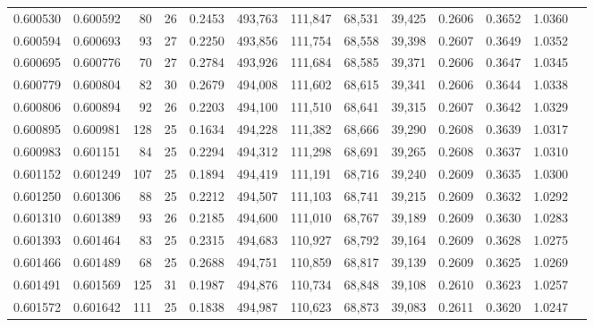 \begin{tabular}{rrrrrrrrrrrrr}
0.600530 & 0.600592 &  80 &  26 &                                     0.2453 & 493,763 & 111,847 &  68,531 &  39,425 & 0.2606 & 0.3652 & 1.0360 \\
0.600594 & 0.600693 &  93 &  27 &                                     0.2250 & 493,856 & 111,754 &  68,558 &  39,398 & 0.2607 & 0.3649 & 1.0352 \\
0.600695 & 0.600776 &  70 &  27 &                                     0.2784 & 493,926 & 111,684 &  68,585 &  39,371 & 0.2606 & 0.3647 & 1.0345 \\
0.600779 & 0.600804 &  82 &  30 &                                     0.2679 & 494,008 & 111,602 &  68,615 &  39,341 & 0.2606 & 0.3644 & 1.0338 \\
0.600806 & 0.600894 &  92 &  26 &                                     0.2203 & 494,100 & 111,510 &  68,641 &  39,315 & 0.2607 & 0.3642 & 1.0329 \\
0.600895 & 0.600981 & 128 &  25 &                                     0.1634 & 494,228 & 111,382 &  68,666 &  39,290 & 0.2608 & 0.3639 & 1.0317 \\
0.600983 & 0.601151 &  84 &  25 &                                     0.2294 & 494,312 & 111,298 &  68,691 &  39,265 & 0.2608 & 0.3637 & 1.0310 \\
0.601152 & 0.601249 & 107 &  25 &                                     0.1894 & 494,419 & 111,191 &  68,716 &  39,240 & 0.2609 & 0.3635 & 1.0300 \\
0.601250 & 0.601306 &  88 &  25 &                                     0.2212 & 494,507 & 111,103 &  68,741 &  39,215 & 0.2609 & 0.3632 & 1.0292 \\
0.601310 & 0.601389 &  93 &  26 &                                     0.2185 & 494,600 & 111,010 &  68,767 &  39,189 & 0.2609 & 0.3630 & 1.0283 \\
0.601393 & 0.601464 &  83 &  25 &                                     0.2315 & 494,683 & 110,927 &  68,792 &  39,164 & 0.2609 & 0.3628 & 1.0275 \\
0.601466 & 0.601489 &  68 &  25 &                                     0.2688 & 494,751 & 110,859 &  68,817 &  39,139 & 0.2609 & 0.3625 & 1.0269 \\
0.601491 & 0.601569 & 125 &  31 &                                     0.1987 & 494,876 & 110,734 &  68,848 &  39,108 & 0.2610 & 0.3623 & 1.0257 \\
0.601572 & 0.601642 & 111 &  25 &                                     0.1838 & 494,987 & 110,623 &  68,873 &  39,083 & 0.2611 & 0.3620 & 1.0247 \\

\end{tabular}
